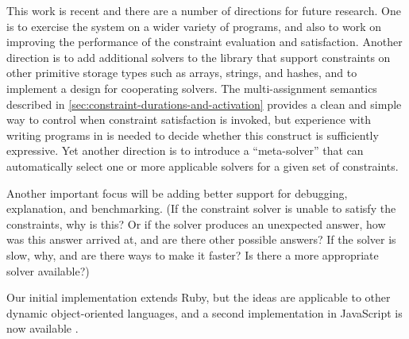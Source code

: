This work is recent and there are a number of directions for future
research.  One is to exercise the system on a wider variety of
programs, and also to work on improving the performance of the
constraint evaluation and satisfaction.  Another direction is to add
additional solvers to the library that support constraints on other
primitive storage types such as arrays, strings, and hashes, and to
implement a design for cooperating solvers.  The multi-assignment
semantics described in
\autoref{sec:constraint-durations-and-activation} provides a clean and
simple way to control when constraint satisfaction is invoked, but
experience with writing programs in \toolname is needed to decide
whether this construct is sufficiently expressive.  Yet another
direction is to introduce a ``meta-solver'' that can automatically
select one or more applicable solvers for a given set of constraints.

Another important focus will be adding better support for debugging,
explanation, and benchmarking.  (If the constraint solver is unable to
satisfy the constraints, why is this?  Or if the solver produces an
unexpected answer, how was this answer arrived at, and are there other
possible answers?  If the solver is slow, why, and are there ways to
make it faster?  Is there a more appropriate solver available?)

Our initial implementation extends Ruby, but the ideas are applicable
to other dynamic object-oriented languages, and a second implementation in
JavaScript is now available \cite{felgentreff-ecoop-2014}.




